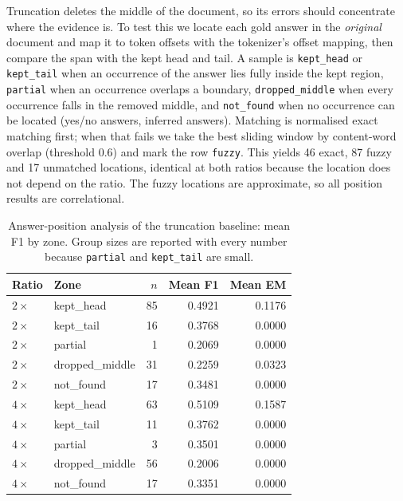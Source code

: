 \documentclass[10pt,a4paper,twocolumn]{article}
\begin{document}
Truncation deletes the middle of the document, so its errors should concentrate
where the evidence is. To test this we locate each gold answer in the
\emph{original} document and map it to token offsets with the tokenizer's offset
mapping, then compare the span with the kept head and tail. A sample is
\texttt{kept\_head} or \texttt{kept\_tail} when an occurrence of the answer lies
fully inside the kept region, \texttt{partial} when an occurrence overlaps a
boundary, \texttt{dropped\_middle} when every occurrence falls in the removed
middle, and \texttt{not\_found} when no occurrence can be located (yes/no answers,
inferred answers). Matching is normalised exact matching first; when that fails we
take the best sliding window by content-word overlap (threshold 0.6) and mark the
row \texttt{fuzzy}. This yields 46 exact, 87 fuzzy and 17 unmatched locations,
identical at both ratios because the location does not depend on the ratio. The
fuzzy locations are approximate, so all position results are correlational.

\begin{table}[t]
\centering
\footnotesize
\setlength{\tabcolsep}{3.4pt}
\begin{tabular}{@{}llrrr@{}}
\toprule
Ratio & Zone & $n$ & Mean F1 & Mean EM \\
\midrule
$2\times$ & kept\_head      & 85 & 0.4921 & 0.1176 \\
$2\times$ & kept\_tail      & 16 & 0.3768 & 0.0000 \\
$2\times$ & partial         & 1  & 0.2069 & 0.0000 \\
$2\times$ & dropped\_middle & 31 & 0.2259 & 0.0323 \\
$2\times$ & not\_found      & 17 & 0.3481 & 0.0000 \\
\midrule
$4\times$ & kept\_head      & 63 & 0.5109 & 0.1587 \\
$4\times$ & kept\_tail      & 11 & 0.3762 & 0.0000 \\
$4\times$ & partial         & 3  & 0.3501 & 0.0000 \\
$4\times$ & dropped\_middle & 56 & 0.2006 & 0.0000 \\
$4\times$ & not\_found      & 17 & 0.3351 & 0.0000 \\
\bottomrule
\end{tabular}
\caption{Answer-position analysis of the truncation baseline: mean F1 by zone.
Group sizes are reported with every number because \texttt{partial} and
\texttt{kept\_tail} are small.}
\label{tab:zone}
\end{table}
\end{document}
